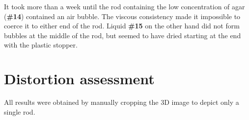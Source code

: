 It took more than a week until the rod containing the low concentration of agar (\textbf{\#14}) contained an air bubble.
The viscous consistency made it impossible to coerce it to either end of the rod.
Liquid \textbf{\#15} on the other hand did not form bubbles at the middle of the rod, but seemed to have dried starting at the end with the plastic stopper.


\section{Distortion assessment}
All results were obtained by manually cropping the 3D image to depict only a single rod.



